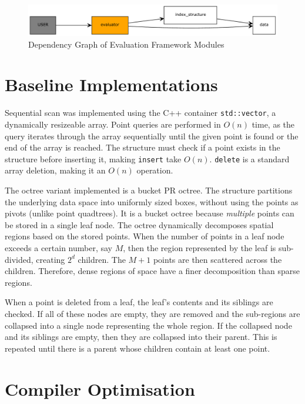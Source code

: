 \begin{figure}
	\centering
	\includegraphics[scale=0.6]{figures/evaluation_framework.pdf}
	\caption{Dependency Graph of Evaluation Framework Modules}
	\label{fig:evaluation-framework}
\end{figure}

\section{Baseline Implementations}

Sequential scan was implemented using the C++ container \texttt{std::vector}, a dynamically resizeable array.  Point queries are performed in $O(n)$ time, as the query iterates through the array sequentially until the given point is found or the end of the array is reached. The structure must check if a point exists in the structure before inserting it, making \texttt{insert} take $O(n)$. \texttt{delete} is a standard array deletion, making it an $O(n)$ operation.

The octree variant implemented is a bucket PR octree. The structure partitions the underlying data space into uniformly sized boxes, without using the points as pivots (unlike point quadtrees). It is a bucket octree because \textit{multiple} points can be stored in a single leaf node. The octree dynamically decomposes spatial regions based on the stored points. When the number of points in a leaf node exceeds a certain number, say $M$, then the region represented by the leaf is sub-divided, creating $2^d$ children. The $M + 1$ points are then scattered across the children. Therefore, dense regions of space have a finer decomposition than sparse regions.

When a point is deleted from a leaf, the leaf's contents and its siblings are checked. If all of these nodes are empty, they are removed and the sub-regions are collapsed into a single node representing the whole region. If the collapsed node and its siblings are empty, then they are collapsed into their parent. This is repeated until there is a parent whose children contain at least one point.

\section{Compiler Optimisation}

